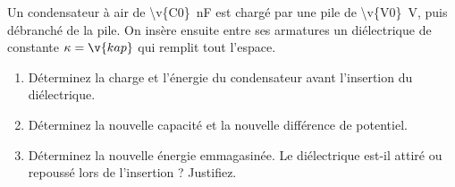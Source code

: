 Un condensateur à air de \qty{\v{C0}}{nF} est chargé par une pile de \qty{\v{V0}}{V}, puis débranché de la pile. On insère ensuite entre ses armatures un diélectrique de constante $\kappa = \v{kap}$ qui remplit tout l'espace.

\begin{enumerate}[label=\alph*)]
    \item Déterminez la charge et l'énergie du condensateur avant l'insertion du diélectrique.
    \item Déterminez la nouvelle capacité et la nouvelle différence de potentiel.
    \item Déterminez la nouvelle énergie emmagasinée. Le diélectrique est-il attiré ou repoussé lors de l'insertion ? Justifiez.
\end{enumerate}
